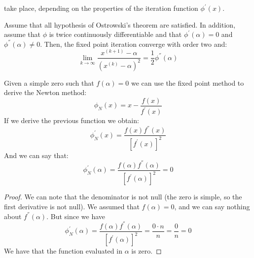 \documentclass[12pt, a4paper]{report}
\newtheorem[style=M,bodystyle=\normalfont]{theorem}{Theorem}
\newtheorem[style=M,bodystyle=\normalfont]{proposition}{Proposition}
\newtheorem[style=M,bodystyle=\normalfont]{corollary}{Corollary}
\newtheorem[style=M,bodystyle=\normalfont]{lemma}{Lemma}
\newtheorem[style=M,bodystyle=\normalfont]{definition}{Definition}
\begin{document}
    take place, depending on the properties of the iteration function $\phi^{'}(x)$. 
    \begin{proposition}
        Assume that all hypothesis of Ostrowski's theorem are satisfied. In addition, assume that $\phi$ is twice continuously differentiable and that $\phi^{'}(\alpha)=0$ and 
        $\phi^{''}(\alpha) \neq 0$. Then, the fixed point iteration converge with order two and:
        \[\lim_{k \rightarrow \infty}\dfrac{x^{(k+1)}-\alpha}{\left(x^{(k)}-\alpha\right)^2}=\dfrac{1}{2}\phi^{''}(\alpha)\]
    \end{proposition}
    Given a simple zero such that $f(\alpha)=0$ we can use the fixed point method to derive the Newton method: 
    \[\phi_N(x)=x-\dfrac{f(x)}{f^{'}(x)}\]
    If we derive the previous function we obtain:
    \[\phi^{'}_N(x)=\dfrac{f(x)f^{''}(x)}{\left[f^{'}(x)\right]^2}\]
    And we can say that: 
    \[\phi^{'}_N(\alpha)=\dfrac{f(\alpha)f^{''}(\alpha)}{\left[f^{'}(\alpha)\right]^2}=0\]
    \begin{proof}
        We can note that the denominator is not null (the zero is simple, so the first derivative is not null). We assumed that $f(\alpha)=0$, and we can say nothing about 
        $f^{''}(\alpha)$. But since we have 
        \[\phi^{'}_N(\alpha)=\dfrac{f(\alpha)f^{''}(\alpha)}{\left[f^{'}(\alpha)\right]^2}=\dfrac{0 \cdot n}{n}=\dfrac{0}{n}=0\]
        We have that the function evaluated in $\alpha$ is zero. 
    \end{proof}
\end{document}
